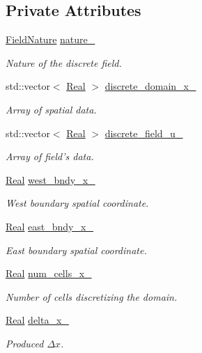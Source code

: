 \subsection*{Private Attributes}
\begin{DoxyCompactItemize}
\item 
\hyperlink{group__c02-enums_ga4c54f2a329cfb4e56213b02a259d19e2}{Field\-Nature} \hyperlink{classmtk_1_1UniStgGrid1D_a061b66c92532b1498ce0e15418754911}{nature\-\_\-}
\begin{DoxyCompactList}\small\item\em Nature of the discrete field. \end{DoxyCompactList}\item 
std\-::vector$<$ \hyperlink{group__c01-roots_gac080bbbf5cbb5502c9f00405f894857d}{Real} $>$ \hyperlink{classmtk_1_1UniStgGrid1D_a0a1f9c00e21659e05f414dd97e2a52e3}{discrete\-\_\-domain\-\_\-x\-\_\-}
\begin{DoxyCompactList}\small\item\em Array of spatial data. \end{DoxyCompactList}\item 
std\-::vector$<$ \hyperlink{group__c01-roots_gac080bbbf5cbb5502c9f00405f894857d}{Real} $>$ \hyperlink{classmtk_1_1UniStgGrid1D_a9a1e7c4ff7f83787a1844d8b24af8045}{discrete\-\_\-field\-\_\-u\-\_\-}
\begin{DoxyCompactList}\small\item\em Array of field's data. \end{DoxyCompactList}\item 
\hyperlink{group__c01-roots_gac080bbbf5cbb5502c9f00405f894857d}{Real} \hyperlink{classmtk_1_1UniStgGrid1D_a6910438d3396d0b9a130d11d16979c46}{west\-\_\-bndy\-\_\-x\-\_\-}
\begin{DoxyCompactList}\small\item\em West boundary spatial coordinate. \end{DoxyCompactList}\item 
\hyperlink{group__c01-roots_gac080bbbf5cbb5502c9f00405f894857d}{Real} \hyperlink{classmtk_1_1UniStgGrid1D_a69a7d6be3171e53177e476348d04f4ae}{east\-\_\-bndy\-\_\-x\-\_\-}
\begin{DoxyCompactList}\small\item\em East boundary spatial coordinate. \end{DoxyCompactList}\item 
\hyperlink{group__c01-roots_gac080bbbf5cbb5502c9f00405f894857d}{Real} \hyperlink{classmtk_1_1UniStgGrid1D_afa43750db0029b7454aef343759e7097}{num\-\_\-cells\-\_\-x\-\_\-}
\begin{DoxyCompactList}\small\item\em Number of cells discretizing the domain. \end{DoxyCompactList}\item 
\hyperlink{group__c01-roots_gac080bbbf5cbb5502c9f00405f894857d}{Real} \hyperlink{classmtk_1_1UniStgGrid1D_a12577bbe0b88e9a0ac9b2267f2fcc48c}{delta\-\_\-x\-\_\-}
\begin{DoxyCompactList}\small\item\em Produced $ \Delta x$. \end{DoxyCompactList}\end{DoxyCompactItemize}

